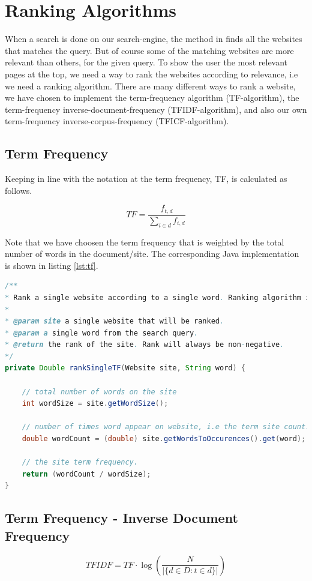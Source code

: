 \section{Ranking Algorithms}
\label{sec:rankingAlgorithms}
When a search is done on our search-engine, the method  in  finds all the websites that matches the query. But of course some of the matching websites are more relevant than others, for the given query. To show the user the most relevant pages at the top, we need a way to rank the websites according to relevance, i.e we need a ranking algorithm. There are many different ways to rank a website, we have chosen to implement the term-frequency algorithm (TF-algorithm), the term-frequency inverse-document-frequency (TFIDF-algorithm), and also our own  term-frequency inverse-corpus-frequency (TFICF-algorithm).    

\subsection{Term Frequency}
Keeping in line with the notation at \cite{wikiTFIDF} the term frequency, TF, is calculated as follows.

\[ TF = \frac{f_{t,d}}{\sum_{i \in d}f_{i,d}} \]

Note that we have choosen the term frequency that is weighted by the total number of words in the document/site. The corresponding Java implementation is shown in listing \ref{lst:tf}.

\begin{lstlisting}[language=Java,
					caption={Implementation of calculating TF rating.},
					label={lst:tf}]
/**
* Rank a single website according to a single word. Ranking algorithm is TF
* 
* @param site a single website that will be ranked.
* @param a single word from the search query.
* @return the rank of the site. Rank will always be non-negative.
*/
private Double rankSingleTF(Website site, String word) {

	// total number of words on the site
	int wordSize = site.getWordSize();
	
	// number of times word appear on website, i.e the term site count.
	double wordCount = (double) site.getWordsToOccurences().get(word);
	
	// the site term frequency.
	return (wordCount / wordSize);
}
\end{lstlisting}


\subsection{Term Frequency - Inverse Document Frequency}
\[ TFIDF = TF \cdot \log{\left(\frac{N}{|\{d \in D : t \in d \}|}\right)}  \]

